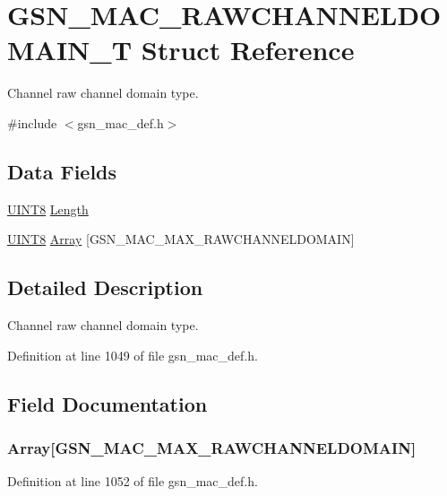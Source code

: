 \hypertarget{a00127}{
\section{GSN\_\-MAC\_\-RAWCHANNELDOMAIN\_\-T Struct Reference}
\label{a00127}
}


Channel raw channel domain type.  




{\ttfamily \#include $<$gsn\_\-mac\_\-def.h$>$}

\subsection*{Data Fields}
\begin{DoxyCompactItemize}
\item 
\hyperlink{a00660_gab27e9918b538ce9d8ca692479b375b6a}{UINT8} \hyperlink{a00127_a92c9c711d62ad0b99ad1f6c2a94f7bc2}{Length}
\item 
\hyperlink{a00660_gab27e9918b538ce9d8ca692479b375b6a}{UINT8} \hyperlink{a00127_af043023e4924e9343f0877883289a174}{Array} \mbox{[}GSN\_\-MAC\_\-MAX\_\-RAWCHANNELDOMAIN\mbox{]}
\end{DoxyCompactItemize}


\subsection{Detailed Description}
Channel raw channel domain type. 

Definition at line 1049 of file gsn\_\-mac\_\-def.h.



\subsection{Field Documentation}
\hypertarget{a00127_af043023e4924e9343f0877883289a174}{
\subsubsection[{Array}]{ {\bf Array}\mbox{[}GSN\_\-MAC\_\-MAX\_\-RAWCHANNELDOMAIN\mbox{]}}}
\label{a00127_af043023e4924e9343f0877883289a174}


Definition at line 1052 of file gsn\_\-mac\_\-def.h.

